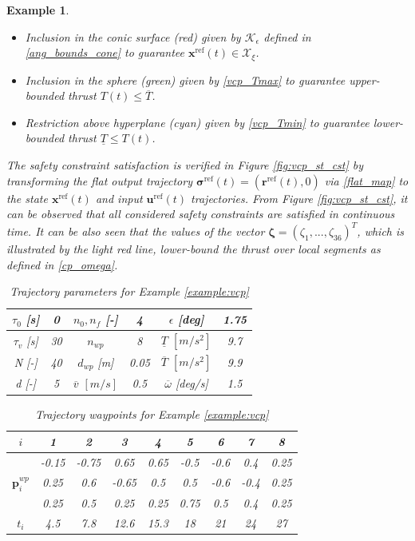 \documentclass[journal,10pt]{IEEEtran}
\newtheorem{example}{\bfseries Example}%
\newcommand{\vect}[1]{\boldsymbol{\mathbf{#1}}}
\newif\ifdraft
\newcommand{\XX}[1]{\ifdraft{\color{red}[{\bf XX}: #1]}\fi}
\begin{document}
\begin{example}
\begin{itemize}
    \item Inclusion in the conic surface (red) given by $\mathcal{K}_{\epsilon}$ defined in \eqref{ang_bounds_cone} to guarantee $\vect{x}^{\text{ref}}(t)\in \mathcal{X}_{\xi}$.
    \item Inclusion in the sphere (green) given by \eqref{vcp_Tmax} to guarantee upper-bounded thrust $T(t)\leq \overline{T}$.
    \item Restriction above hyperplane (cyan) given by \eqref{vcp_Tmin} to guarantee lower-bounded thrust $\underline{T}\leq T(t)$.
\end{itemize}
The safety constraint satisfaction is verified in Figure \ref{fig:vcp_st_cst} by transforming the flat output trajectory $\vect{\sigma}^{\text{ref}}(t)=(\vect{r}^{\text{ref}}(t),0) $ via \eqref{flat_map} to the state $\vect{x}^{\text{ref}}(t)$ and input $\vect{u}^{\text{ref}}(t)$ trajectories. From  Figure \ref{fig:vcp_st_cst}, it can be observed that all considered safety constraints are satisfied in continuous time. It can be also seen that the values of the vector $\vect{\zeta}=(\zeta_1,...,\zeta_{36})^T$, which is illustrated by the light red line, lower-bound the thrust over local segments as defined in \eqref{cp_omega}. %

\begin{table} [bt]
\renewcommand{\arraystretch}{1.3}
\caption{Trajectory parameters for Example \ref{example:vcp}}
\label{tab:sample_trajectory_1}
\centering
\begin{tabular}{|c|c||c|c||c|c|}
\hline
$\tau_0$ [s] & 0 &  $n_0, n_f$ [-] & 4 & $\epsilon$ [deg] & 1.75 \\
\hline
$\tau_v$ [s] & 30 & $n_{wp}$ & 8 &  $\underline{T}$ $[m/s^2]$ & 9.7 \\
\hline
N [-] & 40 & $d_{wp}$ [m]& 0.05 & $\overline{T}$  $[m/s^2]$ & 9.9 \\
\hline
d [-] & 5  & $\overline{v}$ $[m/s]$ & 0.5 & $\overline{\omega}$ [deg/s] & 1.5\\
\hline
\end{tabular}
\end{table}

\begin{table} [bt]
\renewcommand{\arraystretch}{1.3}
\caption{Trajectory waypoints for Example \ref{example:vcp}}
\label{tab:wp_1}
\centering
\begin{tabular}{|c|c c c c c c c c|}
\hline
$i$ & 1 & 2 & 3 & 4 & 5 & 6 & 7 & 8\\
\hline
& -0.15 & -0.75 & 0.65 & 0.65 & -0.5 & -0.6 & 0.4 & 0.25\\
$\vect{p}_i^{wp}$ & 0.25 & 0.6 & -0.65 & 0.5 & 0.5 & -0.6 & -0.4 & 0.25\\
& 0.25 & 0.5 & 0.25 & 0.25 & 0.75 & 0.5 & 0.4 & 0.25\\
\hline
$t_i$ & 4.5 & 7.8 & 12.6 & 15.3 & 18 & 21  & 24 & 27\\
\hline
\end{tabular}
\end{table}




\end{example}
\end{document}
